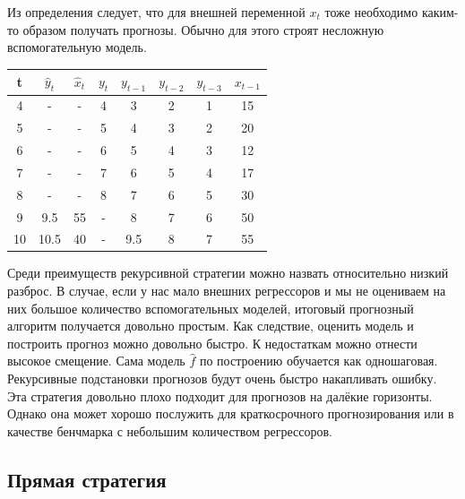 \documentclass[12pt,fleqn]{article}
\begin{document}
Из определения следует, что для внешней переменной $x_t$ тоже необходимо каким-то образом получать прогнозы.
Обычно для этого строят несложную вспомогательную модель.

\begin{table}[!ht]
  \centering
  \begin{tabular}{|c|c|c|c|cccc|}
    \hline
    t  & $\hat{y}_t$ & $\hat{x}_t$ & \textbf{$y_t$} & \textbf{$y_{t-1}$} & $y_{t-2}$ & $y_{t-3}$ & $x_{t-1}$ \\ \hline
    4  & -           & -           & 4              & 3                  & 2         & 1         & 15        \\
    5  & -           & -           & 5              & 4                  & 3         & 2         & 20        \\
    6  & -           & -           & 6              & 5                  & 4         & 3         & 12        \\
    7  & -           & -           & 7              & 6                  & 5         & 4         & 17        \\
    8  & -           & -           & 8              & 7                  & 6         & 5         & 30        \\ \hline
    9  & 9.5         & 55          & -              & 8                  & 7         & 6         & 50        \\
    10 & 10.5        & 40          & -              & 9.5                & 8         & 7         & 55        \\ \hline
  \end{tabular}
\end{table}

Среди преимуществ рекурсивной стратегии можно назвать относительно низкий разброс.
В случае, если у нас мало внешних регрессоров и мы не оцениваем на них большое количество вспомогательных моделей, итоговый прогнозный алгоритм получается довольно простым.
Как следствие, оценить модель и построить прогноз можно довольно быстро.
К недостаткам можно отнести высокое смещение.
Сама модель $\hat{f}$ по построению обучается как одношаговая.
Рекурсивные подстановки прогнозов будут очень быстро накапливать ошибку.
Эта стратегия довольно плохо подходит для прогнозов на далёкие горизонты.
Однако она может хорошо послужить для краткосрочного прогнозирования или в качестве бенчмарка с небольшим количеством регрессоров.

\newpage
\subsection{Прямая стратегия}
\end{document}
